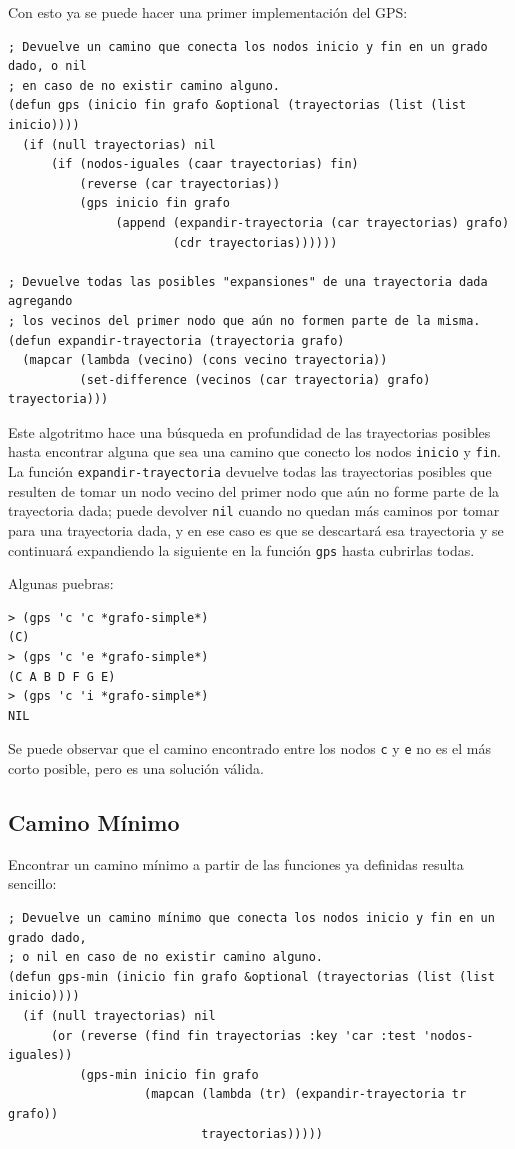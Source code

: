 \documentclass[12pt,titlepage]{article}
\begin{document}
Con esto ya se puede hacer una primer implementación del GPS:
\begin{lstlisting}[basicstyle=\ttfamily\footnotesize]
; Devuelve un camino que conecta los nodos inicio y fin en un grado dado, o nil 
; en caso de no existir camino alguno.
(defun gps (inicio fin grafo &optional (trayectorias (list (list inicio))))
  (if (null trayectorias) nil
      (if (nodos-iguales (caar trayectorias) fin)
          (reverse (car trayectorias))
          (gps inicio fin grafo 
               (append (expandir-trayectoria (car trayectorias) grafo)
                       (cdr trayectorias))))))

; Devuelve todas las posibles "expansiones" de una trayectoria dada agregando 
; los vecinos del primer nodo que aún no formen parte de la misma.
(defun expandir-trayectoria (trayectoria grafo)
  (mapcar (lambda (vecino) (cons vecino trayectoria))
          (set-difference (vecinos (car trayectoria) grafo) trayectoria)))

\end{lstlisting}

Este algotritmo hace una búsqueda en profundidad de las trayectorias posibles hasta encontrar alguna que sea una camino que conecto los nodos \lstinline|inicio| y \lstinline|fin|. La función \lstinline|expandir-trayectoria| devuelve todas las trayectorias posibles que resulten de tomar un nodo vecino del primer nodo que aún no forme parte de la trayectoria dada; puede devolver \lstinline|nil| cuando no quedan más caminos por tomar para una trayectoria dada, y en ese caso es que se descartará esa trayectoria y se continuará expandiendo la siguiente en la función \lstinline|gps| hasta cubrirlas todas.

Algunas puebras:
\begin{lstlisting}
> (gps 'c 'c *grafo-simple*)
(C)
> (gps 'c 'e *grafo-simple*)
(C A B D F G E)
> (gps 'c 'i *grafo-simple*)
NIL
\end{lstlisting}

Se puede observar que el camino encontrado entre los nodos \lstinline|c| y \lstinline|e| no es el más corto posible, pero es una solución válida.

\subsection{Camino Mínimo}

Encontrar un camino mínimo a partir de las funciones ya definidas resulta sencillo:
\begin{lstlisting}[basicstyle=\ttfamily\footnotesize]
; Devuelve un camino mínimo que conecta los nodos inicio y fin en un grado dado,
; o nil en caso de no existir camino alguno.
(defun gps-min (inicio fin grafo &optional (trayectorias (list (list inicio))))
  (if (null trayectorias) nil
      (or (reverse (find fin trayectorias :key 'car :test 'nodos-iguales))
          (gps-min inicio fin grafo
                   (mapcan (lambda (tr) (expandir-trayectoria tr grafo))
                           trayectorias)))))
\end{lstlisting}
\end{document}
